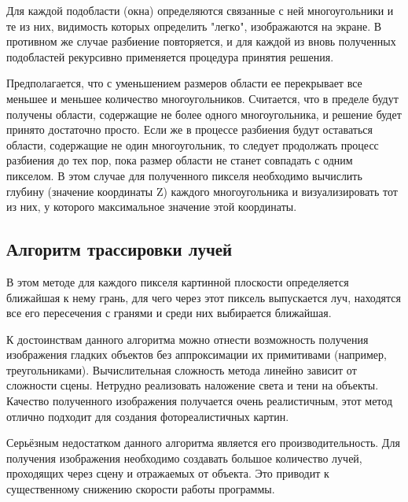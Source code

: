 Для каждой подобласти (окна) определяются связанные с ней многоугольники и те из них, видимость которых определить "легко", изображаются на экране. В противном же случае разбиение повторяется, и для каждой из вновь полученных подобластей рекурсивно применяется процедура принятия решения.

Предполагается, что с уменьшением размеров области ее перекрывает все меньшее и меньшее количество многоугольников. Считается, что в пределе будут получены области, содержащие не более одного многоугольника, и решение будет принято достаточно просто. Если же в процессе разбиения будут оставаться области, содержащие не один многоугольник, то следует продолжать процесс разбиения до тех пор, пока размер области не станет совпадать с одним пикселом. В этом случае для полученного пикселя необходимо вычислить глубину (значение координаты Z) каждого многоугольника и визуализировать тот из них, у которого максимальное значение этой координаты.


\subsection*{Алгоритм трассировки лучей}
В этом методе для каждого пикселя картинной плоскости определяется ближайшая к нему грань, для чего через этот пиксель выпускается луч, находятся все его пересечения с гранями и среди них выбирается ближайшая.
 
К достоинствам данного алгоритма можно отнести возможность получения изображения гладких объектов без аппроксимации их примитивами (например, треугольниками). Вычислительная сложность метода линейно зависит от сложности сцены. Нетрудно реализовать наложение света и тени на объекты. Качество полученного изображения получается очень реалистичным, этот метод отлично подходит для создания фотореалистичных картин.

Серьёзным недостатком данного алгоритма является его производительность. Для получения изображения необходимо создавать большое количество лучей, проходящих через сцену и отражаемых от объекта. Это приводит к существенному снижению скорости работы программы.


